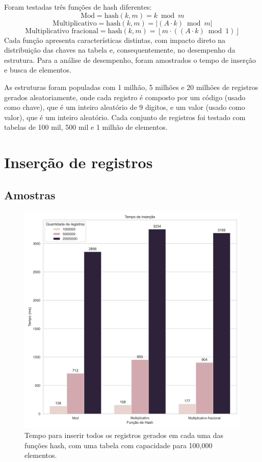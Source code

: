 \documentclass[12pt]{article}
\begin{document}
Foram testadas três funções de hash diferentes: 
$$\text{Mod} = \text{hash}(k, m) = k \bmod m$$
$$\text{Multiplicativo} = \text{hash}(k, m) = \left| (A \cdot k) \bmod m \right|$$
$$\text{Multiplicativo fracional} = \text{hash}(k, m) = \left\lfloor m \cdot ((A \cdot k) \bmod 1) \right\rfloor$$
Cada função apresenta características distintas, com impacto direto na distribuição das chaves na tabela e, consequentemente, no desempenho da estrutura.
Para a análise de desempenho, foram amostrados o tempo de inserção e busca de elementos.

As estruturas foram populadas com 1 milhão, 5 milhões e 20 milhões de registros gerados aleatoriamente, 
onde cada registro é composto por um código (usado como chave), que é um inteiro aleatório de 9 digitos, e um valor (usado como valor), que é um inteiro aleatório.
Cada conjunto de registros foi testado com tabelas de 100 mil, 500 mil e 1 milhão de elementos.

\section{Inserção de registros}

\subsection{Amostras}

\begin{figure}[ht]
\centering
\includegraphics[width=\textwidth,height=\textheight,keepaspectratio]{figures/insertion_runtime_100000.png}
\caption{Tempo para inserir todos os registros gerados em cada uma das funções hash, com uma tabela com capacidade para 100,000 elementos.}
\end{figure}
\end{document}
